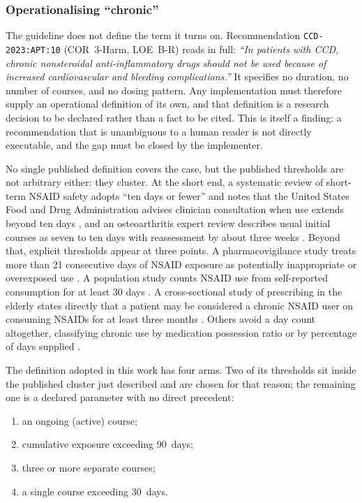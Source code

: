 \subsubsection*{Operationalising ``chronic''}
The guideline does not define the term it turns on. Recommendation
\texttt{CCD-2023:APT:10} (COR~3-Harm, LOE~B-R) reads in full: \emph{``In patients with CCD,
chronic nonsteroidal anti-inflammatory drugs should not be used because of increased
cardiovascular and bleeding complications.''} It specifies no duration, no number of
courses, and no dosing pattern. Any implementation must therefore supply an operational
definition of its own, and that definition is a research decision to be declared rather
than a fact to be cited. This is itself a finding: a recommendation that is unambiguous to
a human reader is not directly executable, and the gap must be closed by the implementer.

No single published definition covers the case, but the published thresholds are not
arbitrary either: they cluster. At the short end, a systematic review of short-term NSAID
safety adopts ``ten days or fewer'' and notes that the United States Food and Drug
Administration advises clinician consultation when use extends beyond ten days
\cite{aminoshariae2016}, and an osteoarthritis expert review describes usual initial courses
as seven to ten days with reassessment by about three weeks
\cite{magni2021}. Beyond that, explicit thresholds appear at three points. A
pharmacovigilance study treats more than 21 consecutive days of NSAID
exposure as potentially inappropriate or overexposed use \cite{ussai2015}. A
population study counts NSAID use from self-reported consumption for at least
30 days \cite{hessami2025}. A cross-sectional study of
prescribing in the elderly states directly that a patient may be considered a chronic NSAID
user on consuming NSAIDs for at least three months
\cite{abdu2020}. Others avoid a day count altogether, classifying chronic use
by medication possession ratio \cite{campbell2022} or by percentage of days
supplied \cite{kikuchi2021}.

The definition adopted in this work has four arms. Two of its thresholds sit inside the
published cluster just described and are chosen for that reason; the remaining one is a
declared parameter with no direct precedent:

\begin{enumerate}
    \item[(i)] an ongoing (active) course;
    \item[(ii)] cumulative exposure exceeding 90~days;
    \item[(iii)] three or more separate courses;
    \item[(iv)] a single course exceeding 30~days.
\end{enumerate}

